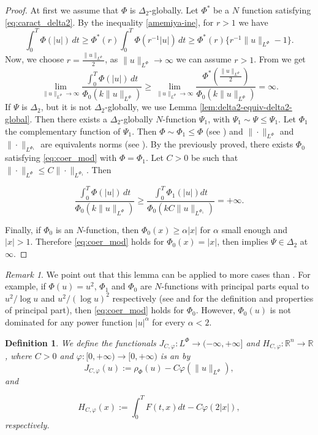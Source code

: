 \documentclass[twoside]{article}
\newtheorem{defi}[thm]{Definition}
\theoremstyle{remark}
\newtheorem{comentario}{Remark}
\newcommand{\orlnor}{\|_{L^{\Phi}}}
\newcommand{\lphi}{L^{\Phi}}
\newcommand{\rr}{\mathbb{R}}
\renewcommand{\leq}{\leqslant}
\renewcommand{\geq}{\geqslant}
\newcounter{example}
\begin{document}
\begin{proof} At first we assume that $\Phi$ is $\Delta_2$-globally. Let $\Phi^*$ be a $N$ function satisfying \eqref{eq:caract_delta2}. By the inequality \eqref{amemiya-ine}, for $r>1$ we have 
\[
\int_0^T \Phi(|u|)\,dt\geq
\Phi^*(r) \int_0^T \Phi(r^{-1}|u|)\,dt\geq
\Phi^*(r)\{r^{-1}\|u\orlnor-1\}.
\]
Now, we choose $r=\frac{\|u\orlnor}{2}$, as $\|u\orlnor\to\infty$ we can assume $r>1$. From \cite[Thm. 2 (b)(v), p. 16]{rao1991theory} we get
\[
\lim\limits_{\|u\orlnor \to \infty} \frac{\int_0^T \Phi(|u|)\,dt}{\Phi_0(k\|u\orlnor)}\geq
\lim\limits_{\|u\orlnor \to \infty} \frac{\Phi^*\left(\frac{\|u\orlnor}{2}\right)}{\Phi_0(k\|u\orlnor)}
=\infty.
\]
 If $\Psi$ is $\Delta_2$, but it is not $\Delta_2$-globally, we  use Lemma \ref{lem:delta2-equiv-delta2-global}. Then there exists a $\Delta_2$-globally $N$-function $\Psi_1$, with $\Psi_1\sim\Psi\leq \Psi_1$. Let $\Phi_1$ the complementary function of $\Psi_1$. Then $\Phi\sim\Phi_1\leq \Phi$ (see \cite[Th. 3.1]{KR}) and $\|\cdot\orlnor$ and $\|\cdot\|_{L^{\Phi_1}}$ are equivalents norms  (see \cite[Th. 13.2 and Th. 13.3]{KR}). By the previously proved, there exists $\Phi_0$ satisfying  \eqref{eq:coer_mod} with $\Phi=\Phi_1$. Let $C>0$ be such that  $\|\cdot\orlnor\leq C\|\cdot\|_{L^{\Phi_1}}$. Then

\[\frac{\int_0^T \Phi(|u|)\,dt}{\Phi_0(k\|u\orlnor)}\geq  \frac{\int_0^T \Phi_1(|u|)dt}{\Phi_0(kC\|u\|_{L^{\Phi_1}})}=+\infty.\]


Finally, if $\Phi_0$ is an $N$-function, then $\Phi_0(x)\geq \alpha |x|$ for  $\alpha$ small enough and $|x|>1$.
Therefore \eqref{eq:coer_mod} holds for $\Phi_0(x)=|x|$, then \cite[Lemma 5.2]{ABGMS2015}  implies  $\Psi\in\Delta_2$ at $\infty$.
\end{proof}


\begin{comentario}  We point out that this lemma can be applied to more cases than \cite[Lemma 5.2]{ABGMS2015}. For example, if $\Phi(u)=u^2$, $\Phi_1$ and $\Phi_0$ are  $N$-functions with principal parts equal to $u^2/\log u$ and $u^2/(\log u)^2$ respectively (see \cite[p. 16]{KR} and \cite[Sec. 7]{KR} for the definition and properties of principal part), then  \eqref{eq:coer_mod} holds for $\Phi_0$.
However, $\Phi_0(u)$ is not dominated for any  power function $|u|^{\alpha}$ for every $\alpha<2$. 
\end{comentario}






\begin{defi}We define the  functionals $J_{C,\varphi}:\lphi\to (-\infty,+\infty]$ and $  H_{C,\varphi}:\rr^n\to \rr$, where $C>0$ and $\varphi:[0,+\infty)\to [0,+\infty)$ is an by
\begin{equation}\label{func_phi}
  J_{C,\varphi}(u):= \rho_{\Phi}\left(u\right)-C\varphi\left(\|u\orlnor\right),
\end{equation}
 and

\begin{equation}\label{eq:functional_H-bis}
 H_{C,\varphi}(x):=\int_0^TF(t,x)dt-C\varphi(2|x|),
\end{equation}
respectively.
\end{defi}
\end{document}
